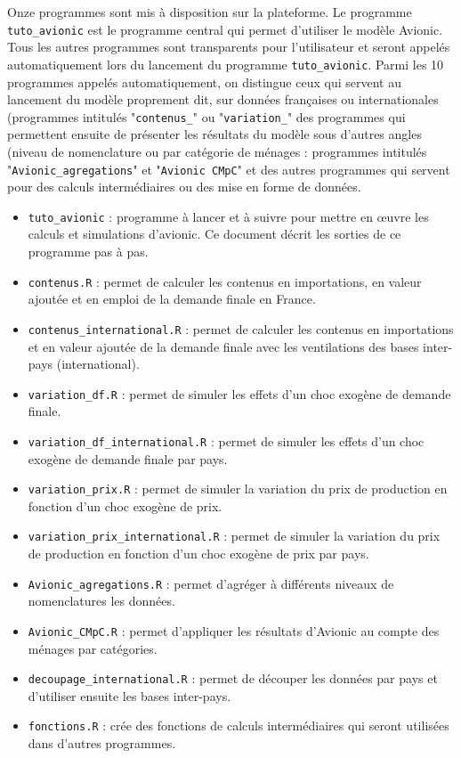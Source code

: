 \documentclass[a4paper,french,11pt]{article}
\begin{document}
Onze programmes sont mis \`a disposition sur la plateforme. Le programme \verb|tuto_avionic| est le programme central qui permet d'utiliser le mod\`ele Avionic. Tous les autres programmes sont transparents pour l'utilisateur et seront appel\'es automatiquement lors du lancement du programme \verb|tuto_avionic|. Parmi les 10 programmes appel\'es automatiquement, on distingue ceux qui servent au lancement du mod\`ele proprement dit, sur donn\'ees fran\c caises ou internationales (programmes intitul\'es "\verb|contenus_|" ou "\verb|variation_|" des programmes qui permettent ensuite de pr\'esenter les r\'esultats du mod\`ele sous d'autres angles (niveau de nomenclature ou par cat\'egorie de m\'enages : programmes intitul\'es "\verb|Avionic_agregations|" et "\verb|Avionic CMpC|" et des autres programmes qui servent pour des calculs interm\'ediaires ou des mise en forme de donn\'ees.


\begin{itemize}

\item \verb|tuto_avionic| : programme \`a lancer et \`a suivre pour mettre en \oe{}uvre les calculs et simulations d'avionic. Ce document d\'ecrit les sorties de ce programme pas \`a pas.

\item \verb|contenus.R| : permet de calculer les contenus en importations, en valeur ajout\'ee et en emploi de la demande finale  en France.
\item \verb|contenus_international.R| : permet de calculer les contenus en importations et en valeur ajout\'ee de la demande finale avec les ventilations des bases inter-pays (international).
\item \verb|variation_df.R| : permet de simuler les effets d'un choc exog\`ene de demande finale.
\item \verb|variation_df_international.R| : permet de simuler les effets d'un choc exog\`ene de demande finale par pays.
\item \verb|variation_prix.R| : permet de simuler la variation du prix de production en fonction d'un choc exog\`ene de prix.
\item \verb|variation_prix_international.R| : permet de simuler la variation du prix de production en fonction d'un choc exog\`ene de prix par pays.
\item \verb|Avionic_agregations.R| : permet d'agr\'eger \`a diff\'erents niveaux de nomenclatures les donn\'ees.
\item \verb|Avionic_CMpC.R| : permet d'appliquer les r\'esultats d'Avionic au compte des m\'enages par catégories.
\item \verb|decoupage_international.R| : permet de d\'ecouper les donn\'ees par pays et d'utiliser ensuite les bases inter-pays.
\item \verb|fonctions.R| : cr\'ee des fonctions de calculs interm\'ediaires qui seront utilis\'ees dans d'autres programmes. 

\end{itemize}
\end{document}
